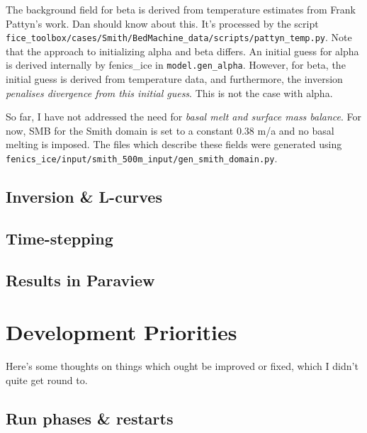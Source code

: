 \documentclass[11pt, reqno, nocenter]{article}
\begin{document}
The background field for beta is derived from temperature estimates from Frank Pattyn's work. Dan should know about this. It's processed by the script\\
 {\tt fice\_toolbox/cases/Smith/BedMachine\_data/scripts/pattyn\_temp.py}. Note that the approach to initializing alpha and beta differs. An initial guess for alpha is derived internally by fenics\_ice in {\tt model.gen\_alpha}. However, for beta, the initial guess is derived from temperature data, and furthermore, the inversion \emph{penalises divergence from this initial guess}. This is not the case with alpha.

So far, I have not addressed the need for \emph{basal melt and surface mass balance}. For now, SMB for the Smith domain is set to a constant 0.38 m/a and no basal melting is imposed. The files which describe these fields were generated using\\ {\tt fenics\_ice/input/smith\_500m\_input/gen\_smith\_domain.py}.

\subsection{Inversion \& L-curves}



\subsection{Time-stepping}

\subsection{Results in Paraview}

\section{Development Priorities}

Here's some thoughts on things which ought be improved or fixed, which I didn't quite get round to.

\subsection{Run phases \& restarts}
\end{document}
